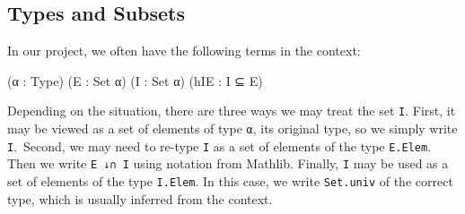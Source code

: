\subsection{Types and Subsets}

In our project, we often have the following terms in the context:
\begin{leancode}
(α : Type) (E : Set α) (I : Set α) (hIE : I ⊆ E)
\end{leancode}
Depending on the situation, there are three ways we may treat the set \texttt{I}. First, it may be viewed as a set of elements of type \texttt{α}, its original type, so we simply write \texttt{I}.\, Second, we may need to re-type \texttt{I} as a set of elements of the type \texttt{E.Elem}. Then we write \texttt{E ↓∩ I} using notation from Mathlib. Finally, \texttt{I} may be used as a set of elements of the type \texttt{I.Elem}. In this case, we write \texttt{Set.univ} of the correct type, which is usually inferred from the context.
